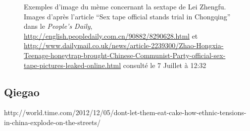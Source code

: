 \begin{figure}[h!]
    \hfill
    \hfill
    \caption{
      Exemples d'image du mème concernant la sextape de Lei Zhengfu. Images d'après l'article ``Sex tape official stands trial in Chongqing'' dans le \textit{People's Daily}, \url{http://english.peopledaily.com.cn/90882/8290628.html} et \url{http://www.dailymail.co.uk/news/article-2239300/Zhao-Hongxia-Teenage-honeytrap-brought-Chinese-Communist-Party-official-sex-tape-pictures-leaked-online.html} consulté le 7 Juillet à 12:32
    }
\end{figure}





\clearpage
\subsection{Qiegao}

http://world.time.com/2012/12/05/dont-let-them-eat-cake-how-ethnic-tensions-in-china-explode-on-the-streets/


